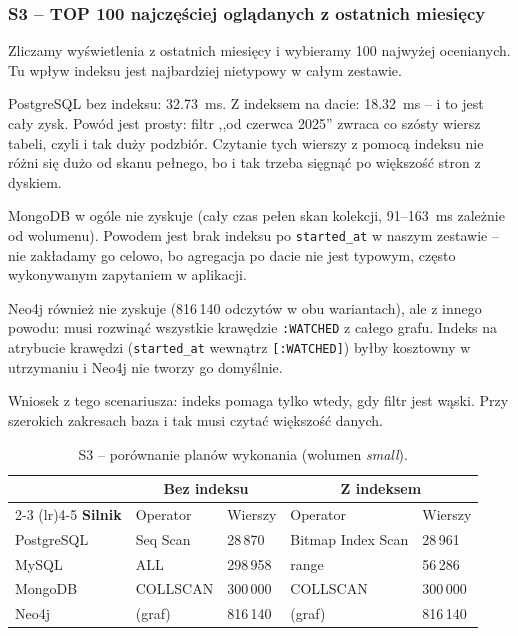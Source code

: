 \subsubsection*{S3 -- TOP 100 najczęściej oglądanych z ostatnich miesięcy}

Zliczamy wyświetlenia z ostatnich miesięcy i wybieramy 100 najwyżej
ocenianych. Tu wpływ indeksu jest najbardziej nietypowy w całym
zestawie.

PostgreSQL bez indeksu: 32.73~ms. Z indeksem na dacie: 18.32~ms --
i to jest cały zysk. Powód jest prosty: filtr ,,od czerwca 2025''
zwraca co szósty wiersz tabeli, czyli i tak duży podzbiór. Czytanie
tych wierszy z pomocą indeksu nie różni się dużo od skanu pełnego,
bo i tak trzeba sięgnąć po większość stron z dyskiem.

MongoDB w ogóle nie zyskuje (cały czas pełen skan kolekcji,
91--163~ms zależnie od wolumenu). Powodem jest brak indeksu po
\texttt{started\_at} w naszym zestawie -- nie zakładamy go celowo,
bo agregacja po dacie nie jest typowym, często wykonywanym zapytaniem
w aplikacji.

Neo4j również nie zyskuje (816\,140 odczytów w obu wariantach),
ale z innego powodu: musi rozwinąć wszystkie krawędzie
\texttt{:WATCHED} z całego grafu. Indeks na atrybucie krawędzi
(\texttt{started\_at} wewnątrz \texttt{[:WATCHED]}) byłby kosztowny
w utrzymaniu i Neo4j nie tworzy go domyślnie.

Wniosek z tego scenariusza: indeks pomaga tylko wtedy, gdy filtr
jest wąski. Przy szerokich zakresach baza i tak musi czytać
większość danych.

\begin{table}[H]
    \centering
    \small
    \begin{tabular}{lllll}
        \toprule
        & \multicolumn{2}{c}{\textbf{Bez indeksu}} & \multicolumn{2}{c}{\textbf{Z indeksem}} \\
        \cmidrule(lr){2-3} \cmidrule(lr){4-5}
        \textbf{Silnik} & Operator & Wierszy & Operator & Wierszy \\
        \midrule
        PostgreSQL & Seq Scan & 28\,870  & Bitmap Index Scan & 28\,961 \\
        MySQL      & ALL      & 298\,958 & range             & 56\,286 \\
        MongoDB    & COLLSCAN & 300\,000 & COLLSCAN          & 300\,000 \\
        Neo4j      & (graf)   & 816\,140 & (graf)            & 816\,140 \\
        \bottomrule
    \end{tabular}
    \caption{S3 -- porównanie planów wykonania (wolumen \emph{small}).}
    \label{tab:explain_s3}
\end{table}

